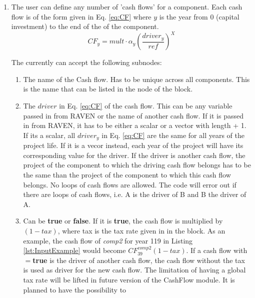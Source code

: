 \begin{enumerate}
  \item[\xmlNode{CashFlows}] The user can define any number of 'cash flows' for a component. Each cash flow is of the form given in
    Eq. \ref{eq:CF} where $y$ is the year from 0 (capital investment) to the end of the  of the component.
    \begin{equation}\label{eq:CF}
    CF_{y}=mult\cdot\alpha_{y}\left ( \frac{driver_{y}}{ref} \right )^{X}
    \end{equation}

  The  currently can accept the following subnodes:


  \begin{enumerate}
    \item[\xmlAttr{name}] The name of the Cash flow. Has to be unique across all components. This is the name that can be listed in the
       node of the  block.
    \item[\xmlAttr{driver}] The $driver$ in Eq. \ref{eq:CF} of the cash flow. This can be any variable passed in from RAVEN or the name
      of another cash flow. If it is passed in from RAVEN, it has to be either a scalar or a vector with length  + 1.
      If its a scalar, all $driver_{y}$ in Eq. \ref{eq:CF}  are the same for all years of the project life. If it is a vecor instead, each
      year of the project  will have its corresponding value for the driver. If the driver is another
      cash flow, the project  of the component to which the driving cash flow belongs has to be the same than the project
       of the component to which this
      cash flow belongs. No loops of cash flows are allowed. The code will error out if there are loops of cash flows, i.e. A is the driver
      of B and B the driver of A.
    \item[\xmlAttr{tax}] Can be \textbf{true} or \textbf{false}. If it is \textbf{true}, the cash flow is multiplied by $(1-tax)$, where tax
      is the tax rate given in  in the 
      block. As an example, the cash flow of \textit{comp2} for year 119 in Listing \ref{lst:InputExample} would become $CF^{comp2}_{39}(1-tax)$.
      If a cash flow with $=$\textbf{true} is the driver of another cash flow, the cash flow without the tax is used as driver for the new cash flow.
      The limitation of having a global tax rate will be lifted in future version of the CashFlow module. It is planned to have the possibility to

\end{enumerate}
\end{enumerate}
